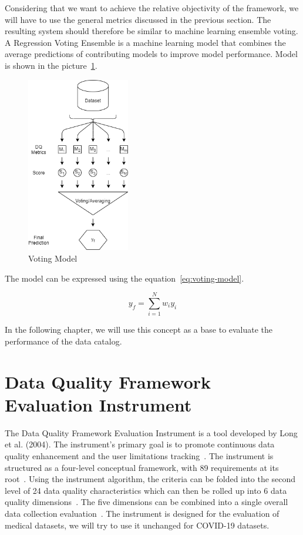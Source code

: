 Considering that we want to achieve the relative objectivity of the framework, we will have to use the general metrics discussed in the previous section.
The resulting system should therefore be similar to machine learning ensemble voting.
A Regression Voting Ensemble is a machine learning model that combines the average predictions of contributing models to improve model performance.
Model is shown in the picture~\ref{fig:voting}.

\begin{figure}[htb]
    \centering
    \includegraphics[width=0.4\textwidth]{figures/voting.png}
    \caption{Voting Model}
    \label{fig:voting}
\end{figure}
\FloatBarrier

The model can be expressed using the equation~\ref{eq:voting-model}.

\begin{equation}\label{eq:voting-model}
    y_f = \sum_{i = 1}^{N} w_i y_i
\end{equation}

In the following chapter, we will use this concept as a base to evaluate the performance of the data catalog.

\section{Data Quality Framework Evaluation Instrument}\label{sec:evaluation-instrument}

The Data Quality Framework Evaluation Instrument is a tool developed by Long et al. (2004).
The instrument's primary goal is to promote continuous data quality enhancement and the user limitations tracking~\cite{long2004}.
The instrument is structured as a four-level conceptual framework, with 89 requirements at its root~\cite{long2004}.
Using the instrument algorithm, the criteria can be folded into the second level of 24 data quality characteristics which can then be rolled up into 6 data quality dimensions~\cite{long2004}.
The five dimensions can be combined into a single overall data collection evaluation~\cite{long2004}.
The instrument is designed for the evaluation of medical datasets, we will try to use it unchanged for COVID-19 datasets.

